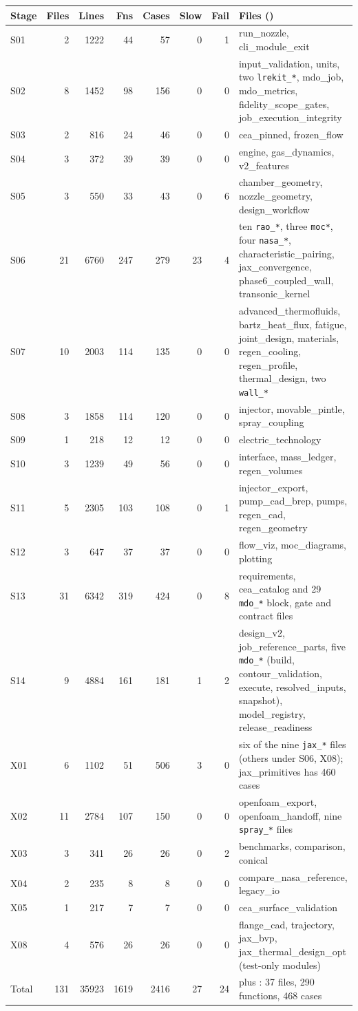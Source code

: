 {\chelevenTables
\begin{longtable}{lrrrrrrP{6.9cm}}
\toprule
Stage & Files & Lines & Fns & Cases & Slow & Fail & Files () \\
\midrule\endhead
S01 & 2 & 1222 & 44 & 57 & 0 & 1 & run\_nozzle, cli\_module\_exit \\
S02 & 8 & 1452 & 98 & 156 & 0 & 0 & input\_validation, units, two \texttt{lrekit\_*}, mdo\_job, mdo\_metrics, fidelity\_scope\_gates, job\_execution\_integrity \\
S03 & 2 & 816 & 24 & 46 & 0 & 0 & cea\_pinned, frozen\_flow \\
S04 & 3 & 372 & 39 & 39 & 0 & 0 & engine, gas\_dynamics, v2\_features \\
S05 & 3 & 550 & 33 & 43 & 0 & 6 & chamber\_geometry, nozzle\_geometry, design\_workflow \\
S06 & 21 & 6760 & 247 & 279 & 23 & 4 & ten \texttt{rao\_*}, three \texttt{moc*}, four \texttt{nasa\_*}, characteristic\_pairing, jax\_convergence, phase6\_coupled\_wall, transonic\_kernel \\
S07 & 10 & 2003 & 114 & 135 & 0 & 0 & advanced\_thermofluids, bartz\_heat\_flux, fatigue, joint\_design, materials, regen\_cooling, regen\_profile, thermal\_design, two \texttt{wall\_*} \\
S08 & 3 & 1858 & 114 & 120 & 0 & 0 & injector, movable\_pintle, spray\_coupling \\
S09 & 1 & 218 & 12 & 12 & 0 & 0 & electric\_technology \\
S10 & 3 & 1239 & 49 & 56 & 0 & 0 & interface, mass\_ledger, regen\_volumes \\
S11 & 5 & 2305 & 103 & 108 & 0 & 1 & injector\_export, pump\_cad\_brep, pumps, regen\_cad, regen\_geometry \\
S12 & 3 & 647 & 37 & 37 & 0 & 0 & flow\_viz, moc\_diagrams, plotting \\
S13 & 31 & 6342 & 319 & 424 & 0 & 8 & requirements, cea\_catalog and 29 \texttt{mdo\_*} block, gate and contract files \\
S14 & 9 & 4884 & 161 & 181 & 1 & 2 & design\_v2, job\_reference\_parts, five \texttt{mdo\_*} (build, contour\_validation, execute, resolved\_inputs, snapshot), model\_registry, release\_readiness \\
X01 & 6 & 1102 & 51 & 506 & 3 & 0 & six of the nine \texttt{jax\_*} files (others under S06, X08); jax\_primitives has 460 cases \\
X02 & 11 & 2784 & 107 & 150 & 0 & 0 & openfoam\_export, openfoam\_handoff, nine \texttt{spray\_*} files \\
X03 & 3 & 341 & 26 & 26 & 0 & 2 & benchmarks, comparison, conical \\
X04 & 2 & 235 & 8 & 8 & 0 & 0 & compare\_nasa\_reference, legacy\_io \\
X05 & 1 & 217 & 7 & 7 & 0 & 0 & cea\_surface\_validation \\
X08 & 4 & 576 & 26 & 26 & 0 & 0 & flange\_cad, trajectory, jax\_bvp, jax\_thermal\_design\_opt (test-only modules) \\
\midrule
Total & 131 & 35923 & 1619 & 2416 & 27 & 24 & plus : 37 files, 290 functions, 468 cases \\
\bottomrule
\end{longtable}}
